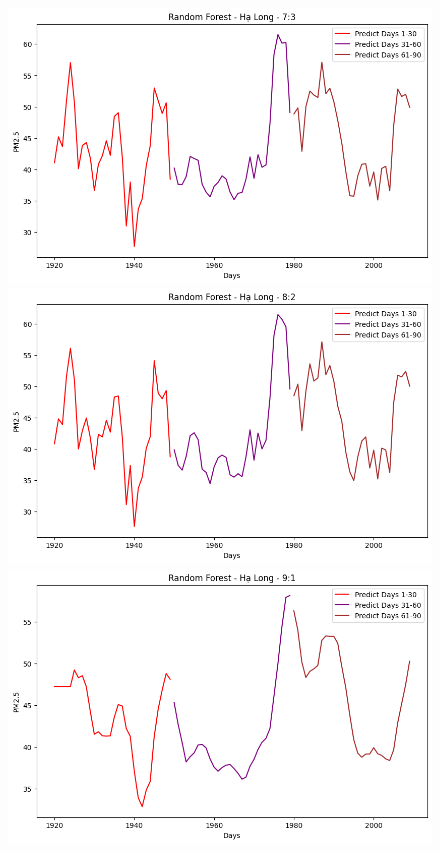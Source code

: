 \begin{figure}[H]
    \begin{minipage}{0.15\textwidth}
        \centering
        \includegraphics[width=1\textwidth,height=0.5\textwidth]{img/final/RF/90D/RF_7_3_HL_90D.png}
        \end{minipage}
        \hfill
        \begin{minipage}{0.15\textwidth}
        \centering
        \includegraphics[width=1\textwidth,height=0.5\textwidth]{img/final/RF/90D/RF_8_2_HL_90D.png}
        \end{minipage}
        \hfill
        \begin{minipage}{0.15\textwidth}
        \centering
        \includegraphics[width=1\textwidth,height=0.5\textwidth]{img/final/RF/90D/RF_9_1_HL_90D.png}
        \end{minipage}
        \hfill


\end{figure}

